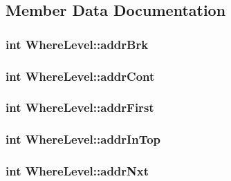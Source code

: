 \subsection{Member Data Documentation}
\hypertarget{struct_where_level_a06f788bd4109f394d162250af9582e45}{
\subsubsection[{addr\-Brk}]{\setlength{\rightskip}{0pt plus 5cm}int Where\-Level\-::addr\-Brk}}\label{struct_where_level_a06f788bd4109f394d162250af9582e45}
\hypertarget{struct_where_level_a493d44d8f3b53d4d47191d751f8a9a94}{
\subsubsection[{addr\-Cont}]{\setlength{\rightskip}{0pt plus 5cm}int Where\-Level\-::addr\-Cont}}\label{struct_where_level_a493d44d8f3b53d4d47191d751f8a9a94}
\hypertarget{struct_where_level_a2d87c8fb787ca4111d7ab38a838325a8}{
\subsubsection[{addr\-First}]{\setlength{\rightskip}{0pt plus 5cm}int Where\-Level\-::addr\-First}}\label{struct_where_level_a2d87c8fb787ca4111d7ab38a838325a8}
\hypertarget{struct_where_level_a3813cb6e47eeb9d488d22f8b5a599aa5}{
\subsubsection[{addr\-In\-Top}]{\setlength{\rightskip}{0pt plus 5cm}int Where\-Level\-::addr\-In\-Top}}\label{struct_where_level_a3813cb6e47eeb9d488d22f8b5a599aa5}
\hypertarget{struct_where_level_ab4b748f1fa2ec727f00ca42d9df60144}{
\subsubsection[{addr\-Nxt}]{\setlength{\rightskip}{0pt plus 5cm}int Where\-Level\-::addr\-Nxt}}\label{struct_where_level_ab4b748f1fa2ec727f00ca42d9df60144}
